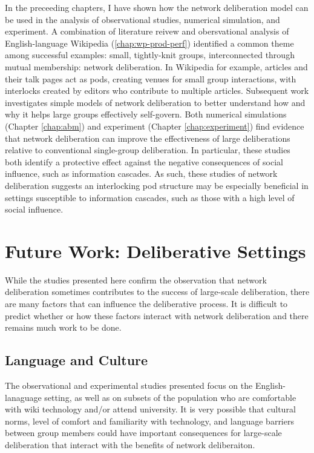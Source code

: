 In the preceeding chapters, I have shown how the network deliberation model can be
used in the analysis of observational studies, numerical simulation, and experiment.
A combination of literature reivew and obersvational analysis of English-language Wikipedia
(\ref{chap:wp-prod-perf}) identified a common theme among successful examples:
small, tightly-knit groups, interconnected through mutual membership: network deliberation.
In Wikipedia for example, articles and their talk pages act as pods,
creating venues for small group interactions, with interlocks created by editors who contribute
to multiple articles.
Subsequent work investigates simple models of network deliberation to better understand
how and why it helps large groups effectively self-govern.
Both numerical simulations (Chapter \ref{chap:abm}) and experiment (Chapter \ref{chap:experiment})
find evidence that network deliberation can improve the effectiveness of large deliberations
relative to conventional single-group deliberation.
In particular, these studies both identify a protective effect against the negative
consequences of social influence, such as information cascades.
As such, these studies of network deliberation suggests an interlocking pod structure may be especially
beneficial in settings susceptible to information cascades, such as those with a high
level of social influence.

\section{Future Work: Deliberative Settings}
While the studies presented here confirm the observation that network deliberation
sometimes contributes to the success of large-scale deliberation,
there are many factors that can influence the deliberative process.
It is difficult to predict whether or how these factors interact with network deliberation
and there remains much work to be done.

\subsection{Language and Culture}
The observational and experimental studies presented focus on the English-lanaguage setting, as well as on subsets of the population who are comfortable with wiki technology and/or attend university.
It is very possible that cultural norms, level of comfort and familiarity with technology, and language barriers between group members could have important consequences for large-scale deliberation that interact with the benefits of network deliberaiton.

